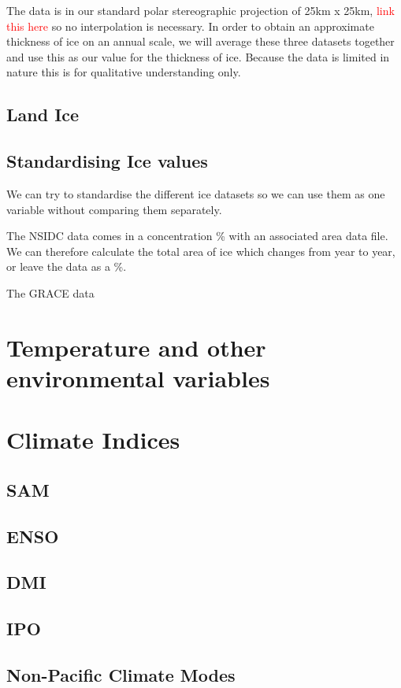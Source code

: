 \documentclass[../main.tex]{subfiles}
\begin{document}
The data is in our standard polar stereographic projection of 25km x 25km, \textcolor{red}{link this here} so no interpolation is necessary. In order to obtain an approximate thickness of ice on an annual scale, we will average these three datasets together and use this as our value for the thickness of ice. Because the data is limited in nature this is for qualitative understanding only.

\subsection*{Land Ice}
\subsection*{Standardising Ice values}

We can try to standardise the different ice datasets so we can use them as one variable without comparing them separately.

The NSIDC data comes in a concentration \% with an associated area data file. We can therefore calculate the total area of ice which changes from year to year, or leave the data as a \%.

The GRACE data



\section{Temperature and other environmental variables}

\section{Climate Indices}
\subsection*{SAM}
\subsection*{ENSO}
\subsection*{DMI}
\subsection*{IPO}
\subsection*{Non-Pacific Climate Modes}
\end{document}
